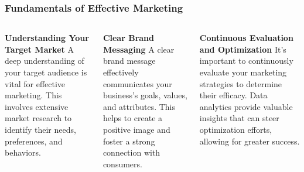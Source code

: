 \documentclass[5pt]{beamer}
\begin{document}
\begin{frame}
\frametitle{Fundamentals of Effective Marketing}
\begin{columns}
\begin{column}{0.3\textwidth}
\begin{block}{\textbf{Understanding Your Target Market}}
A deep understanding of your target audience is vital for effective marketing. This involves extensive market research to identify their needs, preferences, and behaviors.
\end{block}
\end{column}
\begin{column}{0.3\textwidth}
\begin{block}{\textbf{Clear Brand Messaging}}
A clear brand message effectively communicates your business's goals, values, and attributes. This helps to create a positive image and foster a strong connection with consumers.
\end{block}
\end{column}
\begin{column}{0.3\textwidth}
\begin{block}{\textbf{Continuous Evaluation and Optimization}}
It's important to continuously evaluate your marketing strategies to determine their efficacy. Data analytics provide valuable insights that can steer optimization efforts, allowing for greater success.
\end{block}
\end{column}
\end{columns}
\end{frame}
\end{document}
